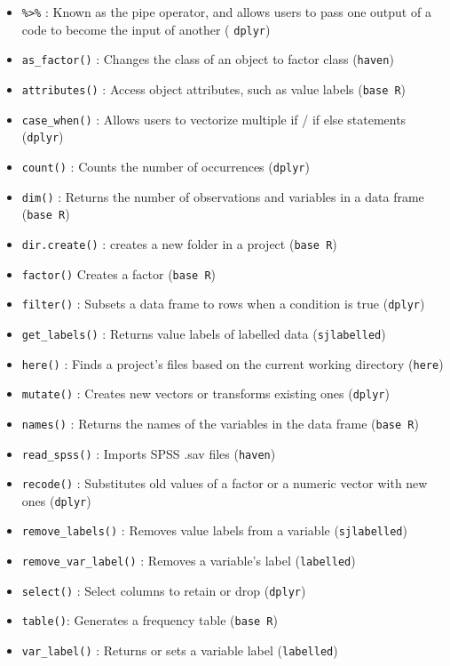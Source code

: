 \documentclass[
]{book}
\providecommand{\tightlist}{%
  \setlength{\itemsep}{0pt}\setlength{\parskip}{0pt}}
\begin{document}
\begin{itemize}
\tightlist
\item
  \texttt{\%\textgreater{}\%} : Known as the pipe operator, and allows users to pass one output of a code to become the input of another ( \texttt{dplyr})
\item
  \texttt{as\_factor()} : Changes the class of an object to factor class (\texttt{haven})
\item
  \texttt{attributes()} : Access object attributes, such as value labels (\texttt{base\ R})
\item
  \texttt{case\_when()} : Allows users to vectorize multiple if / if else statements (\texttt{dplyr})
\item
  \texttt{count()} : Counts the number of occurrences (\texttt{dplyr})
\item
  \texttt{dim()} : Returns the number of observations and variables in a data frame (\texttt{base\ R})
\item
  \texttt{dir.create()} : creates a new folder in a project (\texttt{base\ R})
\item
  \texttt{factor()} Creates a factor (\texttt{base\ R})
\item
  \texttt{filter()} : Subsets a data frame to rows when a condition is true (\texttt{dplyr})
\item
  \texttt{get\_labels()} : Returns value labels of labelled data (\texttt{sjlabelled})
\item
  \texttt{here()} : Finds a project's files based on the current working directory (\texttt{here})
\item
  \texttt{mutate()} : Creates new vectors or transforms existing ones (\texttt{dplyr})
\item
  \texttt{names()} : Returns the names of the variables in the data frame (\texttt{base\ R})
\item
  \texttt{read\_spss()} : Imports SPSS .sav files (\texttt{haven})
\item
  \texttt{recode()} : Substitutes old values of a factor or a numeric vector with new ones (\texttt{dplyr})
\item
  \texttt{remove\_labels()} : Removes value labels from a variable (\texttt{sjlabelled})
\item
  \texttt{remove\_var\_label()} : Removes a variable's label (\texttt{labelled})
\item
  \texttt{select()} : Select columns to retain or drop (\texttt{dplyr})
\item
  \texttt{table()}: Generates a frequency table (\texttt{base\ R})
\item
  \texttt{var\_label()} : Returns or sets a variable label (\texttt{labelled})
\end{itemize}
\end{document}
